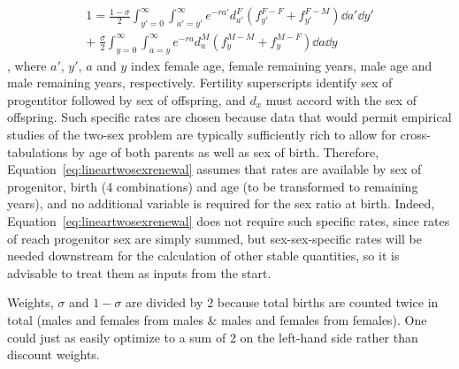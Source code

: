 \begin{equation}
\label{eq:lineartwosexrenewal}
\begin{split}
1 = \frac{1 - \sigma}{2} 
            \int _{y'=0}^\infty \int _{a'=y'}^\infty e^{-ra'}
                      d_{a'}^F \left(f_{y'}^{F-F} + f_{y'}^{F-M}\right) \dd a'
                      \dd y' \\ + \;\frac{\sigma}{2}
            \int _{y=0}^\infty \int _{a=y}^\infty e^{-ra}
                      d_{a}^M  \left(f_{y}^{M-M} + f_{y}^{M-F}\right)\dd a \dd y
\end{split}
\end{equation}
, where $a'$, $y'$, $a$ and $y$ index female age, female remaining years, male
age and male remaining years, respectively. Fertility superscripts identify sex of
progentitor followed by sex of offspring, and $d_x$ must accord with the sex of
offspring. Such specific rates are chosen because data that would permit
empirical studies of the two-sex problem are typically sufficiently rich to allow 
for cross-tabulations by age of both parents as well as sex of birth. 
Therefore, Equation~\eqref{eq:lineartwosexrenewal} assumes that rates are
available by sex of progenitor, birth (4 combinations) and age (to be transformed to remaining years), 
and no additional variable is required for the sex ratio at birth. Indeed,
Equation~\ref{eq:lineartwosexrenewal} does not require such specific rates,
since rates of reach progenitor sex are simply summed, but sex-sex-specific
rates will be needed downstream for the calculation of other stable quantities,
so it is advisable to treat them as inputs from the start.

Weights, $\sigma$ and $1-\sigma$ are divided by 2 because
total births are counted twice in total (males and females from males \&
males and females from females). One could just as easily optimize to a sum of
2 on the left-hand side rather than discount weights.

